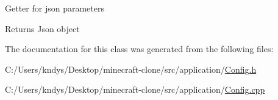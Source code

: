 Getter for json parameters 

\begin{DoxyReturn}{Returns}
Json object
\end{DoxyReturn}


The documentation for this class was generated from the following files\+:\begin{DoxyCompactItemize}
\item 
C\+:/\+Users/kndys/\+Desktop/minecraft-\/clone/src/application/\mbox{\hyperlink{_config_8h}{Config.\+h}}\item 
C\+:/\+Users/kndys/\+Desktop/minecraft-\/clone/src/application/\mbox{\hyperlink{_config_8cpp}{Config.\+cpp}}\end{DoxyCompactItemize}

